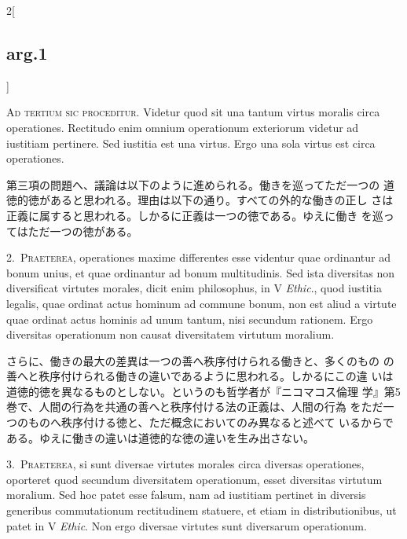 \documentclass[paper=a4paper,fontsize=10pt,jafontsize=9pt,titlepage]{jlreq}
\begin{document}
\begin{paracol}{2}[\subsection{arg.1}]

{\scshape Ad tertium sic proceditur}. Videtur quod sit una tantum
virtus moralis circa operationes. Rectitudo enim omnium operationum
exteriorum videtur ad iustitiam pertinere. Sed iustitia est una
virtus. Ergo una sola virtus est circa operationes.

\switchcolumn

第三項の問題へ、議論は以下のように進められる。働きを巡ってただ一つの
 道徳的徳があると思われる。理由は以下の通り。すべての外的な働きの正し
 さは正義に属すると思われる。しかるに正義は一つの徳である。ゆえに働き
 を巡ってはただ一つの徳がある。


2.~{\scshape Praeterea}, operationes maxime differentes esse videntur
quae ordinantur ad bonum unius, et quae ordinantur ad bonum
multitudinis. Sed ista diversitas non diversificat virtutes morales,
dicit enim philosophus, in V {\itshape Ethic}., quod iustitia legalis,
quae ordinat actus hominum ad commune bonum, non est aliud a virtute
quae ordinat actus hominis ad unum tantum, nisi secundum
rationem. Ergo diversitas operationum non causat diversitatem virtutum
moralium.

\switchcolumn

さらに、働きの最大の差異は一つの善へ秩序付けられる働きと、多くのもの
 の善へと秩序付けられる働きの違いであるように思われる。しかるにこの違
 いは道徳的徳を異なるものとしない。というのも哲学者が『ニコマコス倫理
 学』第5巻で、人間の行為を共通の善へと秩序付ける法の正義は、人間の行為
 をただ一つのものへ秩序付ける徳と、ただ概念においてのみ異なると述べて
 いるからである。ゆえに働きの違いは道徳的な徳の違いを生み出さない。


3.~{\scshape Praeterea}, si sunt diversae virtutes morales circa
diversas operationes, oporteret quod secundum diversitatem
operationum, esset diversitas virtutum moralium. Sed hoc patet esse
falsum, nam ad iustitiam pertinet in diversis generibus commutationum
rectitudinem statuere, et etiam in distributionibus, ut patet in V
{\itshape Ethic}. Non ergo diversae virtutes sunt diversarum
operationum.


\end{paracol}
\end{document}
